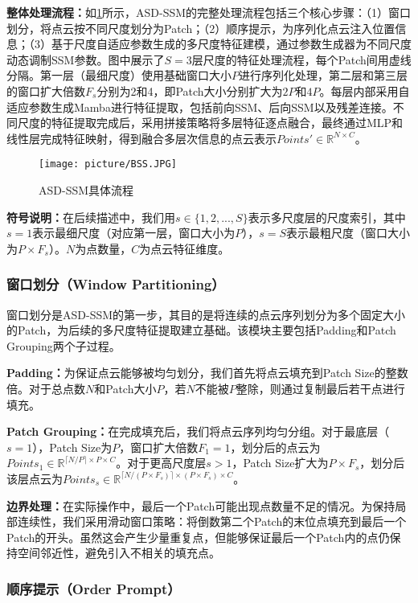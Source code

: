 \documentclass[preprint,12pt]{elsarticle}
\begin{document}
\textbf{整体处理流程：}如\cref{fig:bss}所示，ASD-SSM的完整处理流程包括三个核心步骤：（1）窗口划分，将点云按不同尺度划分为Patch；（2）顺序提示，为序列化点云注入位置信息；（3）基于尺度自适应参数生成的多尺度特征建模，通过参数生成器为不同尺度动态调制SSM参数。图中展示了$S=3$层尺度的特征处理流程，每个Patch间用虚线分隔。第一层（最细尺度）使用基础窗口大小$P$进行序列化处理，第二层和第三层的窗口扩大倍数$F_s$分别为2和4，即Patch大小分别扩大为$2P$和$4P$。每层内部采用自适应参数生成Mamba进行特征提取，包括前向SSM、后向SSM以及残差连接。不同尺度的特征提取完成后，采用拼接策略将多层特征逐点融合，最终通过MLP和线性层完成特征映射，得到融合多层次信息的点云表示$Points'\in\mathbb{R}^{N\times C}$。

\begin{figure}[htbp]
	\centering
	\texttt{[image: picture/BSS.JPG]}
	\caption{ASD-SSM具体流程}
	\label{fig:bss}
\end{figure}


\textbf{符号说明：}在后续描述中，我们用$s \in \{1, 2, ..., S\}$表示多尺度层的尺度索引，其中$s=1$表示最细尺度（对应第一层，窗口大小为$P$），$s=S$表示最粗尺度（窗口大小为$P \times F_s$）。$N$为点数量，$C$为点云特征维度。


\subsubsection{窗口划分（Window Partitioning）}

窗口划分是ASD-SSM的第一步，其目的是将连续的点云序列划分为多个固定大小的Patch，为后续的多尺度特征提取建立基础。该模块主要包括Padding和Patch Grouping两个子过程。

\textbf{Padding：}为保证点云能够被均匀划分，我们首先将点云填充到Patch Size的整数倍。对于总点数$N$和Patch大小$P$，若$N$不能被$P$整除，则通过复制最后若干点进行填充。

\textbf{Patch Grouping：}在完成填充后，我们将点云序列均匀分组。对于最底层（$s=1$），Patch Size为$P$，窗口扩大倍数$F_1=1$，划分后的点云为$Points_1\in\mathbb{R}^{\lceil N/P \rceil\times P \times C}$。对于更高尺度层$s>1$，Patch Size扩大为$P\times F_s$，划分后该层点云为$Points_s\in\mathbb{R}^{\lceil N/(P\times F_s) \rceil\times (P\times F_s) \times C}$。

\textbf{边界处理：}在实际操作中，最后一个Patch可能出现点数量不足的情况。为保持局部连续性，我们采用滑动窗口策略：将倒数第二个Patch的末位点填充到最后一个Patch的开头。虽然这会产生少量重复点，但能够保证最后一个Patch内的点仍保持空间邻近性，避免引入不相关的填充点。


\subsubsection{顺序提示（Order Prompt）}
\end{document}
